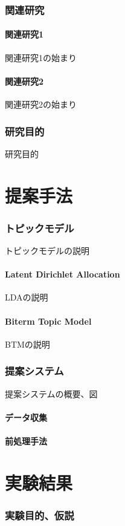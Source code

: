 \documentclass{ltjarticle}
\begin{document}
\section{関連研究}
\subsection{関連研究1}
関連研究1の始まり
\subsection{関連研究2}
関連研究2の始まり

\section{研究目的}
研究目的

\newpage
\part{提案手法}
\section{トピックモデル}
トピックモデルの説明
\subsection{Latent Dirichlet Allocation}
LDAの説明
\subsection{Biterm Topic Model}
BTMの説明
\section{提案システム}
提案システムの概要、図
\subsection{データ収集}
\subsection{前処理手法}

\newpage
\part{実験結果}
\section{実験目的、仮説}
\end{document}
